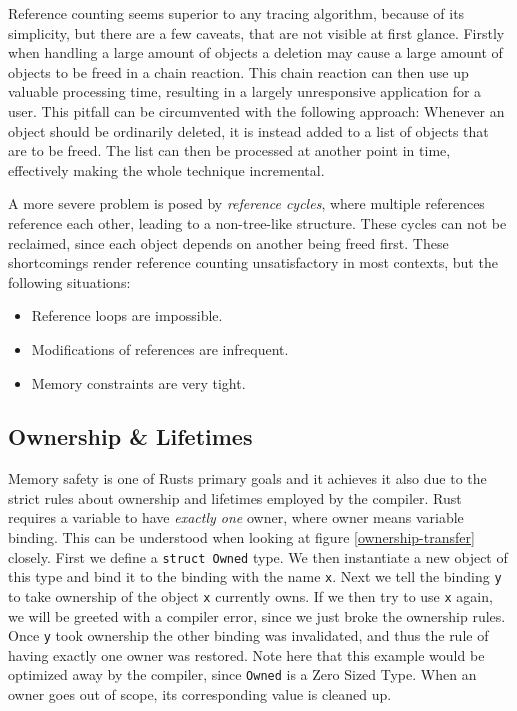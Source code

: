 \documentclass[twocolumn]{article}
\begin{document}
Reference counting seems superior to any tracing algorithm, because of its simplicity, but there are a few caveats, that are not visible at first glance.
Firstly when handling a large amount of objects a deletion may cause a large amount of objects to be freed in a chain reaction.
This chain reaction can then use up valuable processing time, resulting in a largely unresponsive application for a user.
This pitfall can be circumvented with the following approach: Whenever an object should be ordinarily deleted, it is instead added to a list of objects that are to be freed.
The list can then be processed at another point in time, effectively making the whole technique incremental.

A more severe problem is posed by \textit{reference cycles}, where multiple references reference each other, leading to a non-tree-like structure.
These cycles can not be reclaimed, since each object depends on another being freed first.
These shortcomings render reference counting unsatisfactory in most contexts, but the following situations:
\begin{itemize}
        \item Reference loops are impossible.
        \item Modifications of references are infrequent.
        \item Memory constraints are very tight.
\end{itemize}
\subsection{Ownership \& Lifetimes}
Memory safety is one of Rusts primary goals and it achieves it also due to the strict rules about ownership and lifetimes employed by the compiler.
Rust requires a variable to have \textit{exactly one} owner, where owner means variable binding.
This can be understood when looking at figure \ref{ownership-transfer} closely.
First we define a \texttt{struct Owned} type.
We then instantiate a new object of this type and bind it to the binding with the name \texttt{x}.
Next we tell the binding \texttt{y} to take ownership of the object \texttt{x} currently owns.
If we then try to use \texttt{x} again, we will be greeted with a compiler error, since we just broke the ownership rules.
Once \texttt{y} took ownership the other binding was invalidated, and thus the rule of having exactly one owner was restored.
Note here that this example would be optimized away by the compiler, since \texttt{Owned} is a Zero Sized Type\cite{Nomicon-ZST}.
When an owner goes out of scope, its corresponding value is cleaned up.
\end{document}

